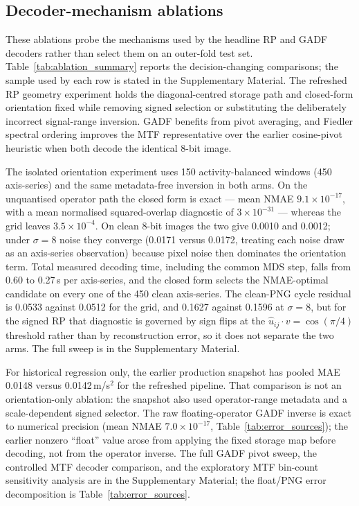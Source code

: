 \documentclass[5p]{elsarticle}
\begin{document}
\subsection{Decoder-mechanism ablations}\label{sec:decoder_ablation}

These ablations probe the mechanisms used by the headline RP and GADF decoders rather than select them on an outer-fold test set. Table~\ref{tab:ablation_summary} reports the decision-changing comparisons; the sample used by each row is stated in the Supplementary Material. The refreshed RP geometry experiment holds the diagonal-centred storage path and closed-form orientation fixed while removing signed selection or substituting the deliberately incorrect signal-range inversion. GADF benefits from pivot averaging, and Fiedler spectral ordering improves the MTF representative over the earlier cosine-pivot heuristic when both decode the identical 8-bit image.

The isolated orientation experiment uses 150 activity-balanced windows (450 axis-series) and the same metadata-free inversion in both arms. On the unquantised operator path the closed form is exact --- mean NMAE \(9.1\times10^{-17}\), with a mean normalised squared-overlap diagnostic of \(3\times10^{-31}\) --- whereas the grid leaves \(3.5\times10^{-4}\). On clean 8-bit images the two give 0.0010 and 0.0012; under \(\sigma=8\) noise they converge (0.0171 versus 0.0172, treating each noise draw as an axis-series observation) because pixel noise then dominates the orientation term. Total measured decoding time, including the common MDS step, falls from 0.60 to 0.27\,s per axis-series, and the closed form selects the NMAE-optimal candidate on every one of the 450 clean axis-series. The clean-PNG cycle residual is 0.0533 against 0.0512 for the grid, and 0.1627 against 0.1596 at \(\sigma=8\), but for the signed RP that diagnostic is governed by sign flips at the \(\hat u_{ij}\cdot v=\cos(\pi/4)\) threshold rather than by reconstruction error, so it does not separate the two arms. The full sweep is in the Supplementary Material.

For historical regression only, the earlier production snapshot has pooled MAE 0.0148 versus 0.0142\,m/s\(^2\) for the refreshed pipeline. That comparison is not an orientation-only ablation: the snapshot also used operator-range metadata and a scale-dependent signed selector. The raw floating-operator GADF inverse is exact to numerical precision (mean NMAE \(7.0\times10^{-17}\), Table~\ref{tab:error_sources}); the earlier nonzero ``float'' value arose from applying the fixed storage map before decoding, not from the operator inverse. The full GADF pivot sweep, the controlled MTF decoder comparison, and the exploratory MTF bin-count sensitivity analysis are in the Supplementary Material; the float/PNG error decomposition is Table~\ref{tab:error_sources}.
\end{document}
